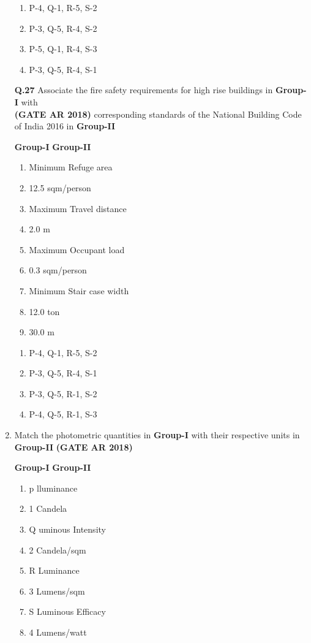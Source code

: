 \documentclass[journal,15pt,onecolumn]{IEEEtran}
\theoremstyle{remark}
\begin{document}
\begin{enumerate}
\begin{enumerate}
\item   P-4, Q-1, R-5, S-2  \item    P-3, Q-5, R-4, S-2 
\item    P-5, Q-1, R-4, S-3  \item    P-3, Q-5, R-4, S-1 
\end{enumerate}


\noindent \textbf{Q.27} \quad Associate the fire safety requirements for high rise buildings in \textbf{Group-I} with \\ \hfill \textbf{ (GATE AR 2018)}
\hspace*{3.3em} corresponding standards of the National Building Code of India 2016 in \textbf{Group-II} 


\textbf{Group-I} \hspace{8cm} \textbf{Group-II} 

\begin{enumerate}
\item      Minimum Refuge area                  \item   12.5 sqm/person
\item      Maximum Travel distance              \item  2.0 m 
\item      Maximum Occupant load                \item   0.3 sqm/person 
\item      Minimum Stair case width             \item 12.0 ton 
                                               \item  30.0 m 
\end{enumerate}

\bigskip

\begin{enumerate}
\item    P-4, Q-1, R-5, S-2 
\item   P-3, Q-5, R-4, S-1 
\item    P-3, Q-5, R-1, S-2 
\item    P-4, Q-5, R-1, S-3 
\end{enumerate}


 

 \item 
  Match the photometric quantities in \textbf{Group-I} with their respective units in \textbf{Group-II}\hfill \textbf{ (GATE AR 2018)}

 \textbf{Group-I}\hspace{8cm} \textbf{Group-II} \\
\vspace{0.15cm}
\begin{enumerate}
\item p  lluminance   \item  1   Candela 
\item  Q  uminous Intensity  \item  2  Candela/sqm 
\item  R  Luminance \item  3  Lumens/sqm
\item  S Luminous Efficacy  \item  4  Lumens/watt


\end{enumerate}
\end{enumerate}
\end{document}
